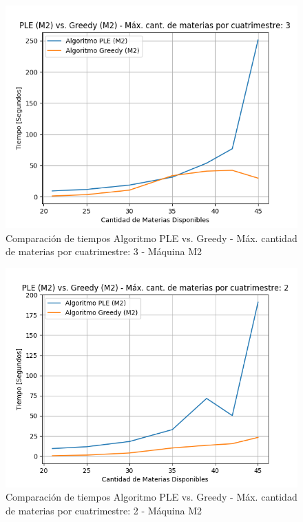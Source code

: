 \documentclass[a4paper]{article}
\begin{document}
\begin{figure}[H]
\centering
\includegraphics[scale=0.65]{Imagenes/m2_PLE_vs_GREEDY_max_mat_3.png}\par
\caption{Comparación de tiempos Algoritmo PLE vs. Greedy - Máx. cantidad de materias por cuatrimestre: 3 - Máquina M2}
\end{figure}

\begin{figure}[H]
\centering
\includegraphics[scale=0.65]{Imagenes/m2_PLE_vs_GREEDY_max_mat_2.png}\par
\caption{Comparación de tiempos Algoritmo PLE vs. Greedy - Máx. cantidad de materias por cuatrimestre: 2 - Máquina M2}
\end{figure}
\end{document}
